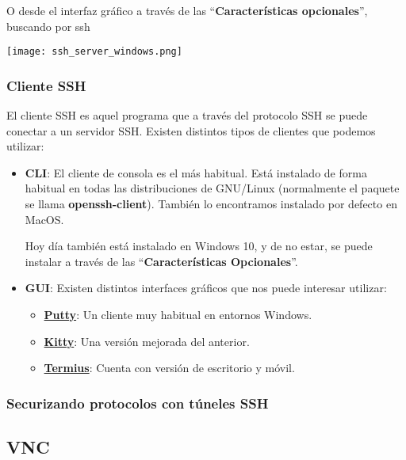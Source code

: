 O desde el interfaz gráfico a través de las “\textbf{Características opcionales}”, buscando por ssh
\begin{center}
    \texttt{[image: ssh\_server\_windows.png]}
\end{center}


\subsubsection{Cliente SSH}
El cliente SSH es aquel programa que a través del protocolo SSH se puede conectar a un servidor SSH. Existen distintos tipos de clientes que podemos utilizar:

\begin{itemize}
    \item \textbf{CLI}: El cliente de consola es el más habitual. Está instalado de forma habitual en todas las distribuciones de GNU/Linux (normalmente el paquete se llama \textbf{openssh-client}). También lo encontramos instalado por defecto en MacOS.

    Hoy día también está instalado en Windows 10, y de no estar, se puede instalar a través de las “\textbf{Características Opcionales}”.

    \item \textbf{GUI}: Existen distintos interfaces gráficos que nos puede interesar utilizar:
    \begin{itemize}
        \item \textbf{\href{https://putty.org/}{Putty}}: Un cliente muy habitual en entornos Windows.
        \item \textbf{\href{https://github.com/cyd01/KiTTY/}{Kitty}}: Una versión mejorada del anterior.
        \item \textbf{\href{https://www.termius.com/}{Termius}}: Cuenta con versión de escritorio y móvil.
    \end{itemize}
\end{itemize}



\subsubsection{Securizando protocolos con túneles SSH}




\subsection{VNC}






\clearpage